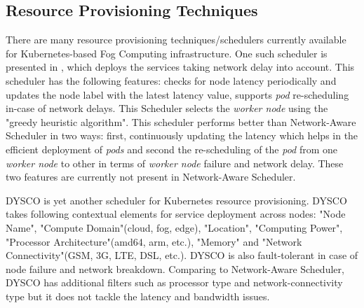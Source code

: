  \subsection{Resource Provisioning Techniques}
  There are many resource provisioning techniques/schedulers currently available for Kubernetes-based Fog Computing infrastructure. One such scheduler is presented in \cite{Haja2019}, which deploys the services taking network delay into account. This scheduler\cite{Haja2019} has the following features: checks for node latency periodically and updates the node label with the latest latency value, supports \emph{pod} re-scheduling in-case of network delays. This Scheduler\cite{Haja2019} selects the \emph{worker node} using the "greedy heuristic algorithm". This scheduler\cite{Haja2019} performs better than Network-Aware Scheduler\cite{Santos2019} in two ways: first, continuously updating the latency which helps in the efficient deployment of \emph{pods} and second the re-scheduling of the \emph{pod} from one \emph{worker node} to other in terms of \emph{worker node} failure and network delay. These two features are currently not present in Network-Aware Scheduler.\par
  DYSCO\cite{Mittermeier2018} is yet another scheduler for Kubernetes resource provisioning. DYSCO takes following contextual elements for service deployment across nodes\cite{Mittermeier2018}: "Node Name", "Compute Domain"(cloud, fog, edge), "Location", "Computing Power", "Processor Architecture"(amd64, arm, etc.), "Memory" and "Network Connectivity"(GSM, 3G, LTE, DSL, etc.). DYSCO is also fault-tolerant in case of node failure and network breakdown\cite{Mittermeier2018}. Comparing to Network-Aware Scheduler\cite{Santos2019}, DYSCO\cite{Mittermeier2018} has additional filters such as processor type and network-connectivity type but it does not tackle the latency and bandwidth issues. \par
